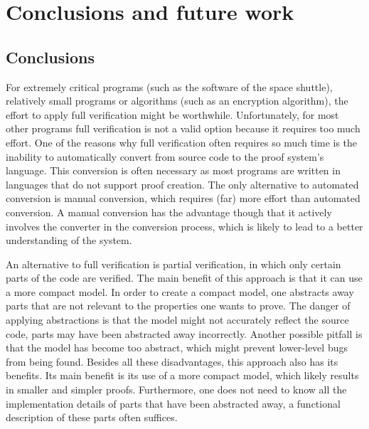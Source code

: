 \hypertarget{conclusions}{\chapter{Conclusions and future work}}

\begin{epigraphs}
\end{epigraphs}

\section{Conclusions}
For extremely critical programs (such as the software of the space shuttle), relatively small programs or algorithms (such as an encryption algorithm), the effort to apply full verification might be worthwhile. Unfortunately, for most other programs full verification is not a valid option because it requires too much effort. One of the reasons why full verification often requires so much time is the inability to automatically convert from source code to the proof system's language. This conversion is often necessary as most programs are written in languages that do not support proof creation. The only alternative to automated conversion is manual conversion, which requires (far) more effort than automated conversion. A manual conversion has the advantage though that it actively involves the converter in the conversion process, which is likely to lead to a better understanding of the system.\emptyline

An alternative to full verification is partial verification, in which only certain parts of the code are verified. The main benefit of this approach is that it can use a more compact model. In order to create a compact model, one abstracts away parts that are not relevant to the properties one wants to prove. The danger of applying abstractions is that the model might not accurately reflect the source code, parts may have been abstracted away incorrectly. Another possible pitfall is that the model has become too abstract, which might prevent lower-level bugs from being found. Besides all these disadvantages, this approach also has its benefits. Its main benefit is its use of a more compact model, which likely results in smaller and simpler proofs. Furthermore, one does not need to know all the implementation details of parts that have been abstracted away, a functional description of these parts often suffices.\emptyline

